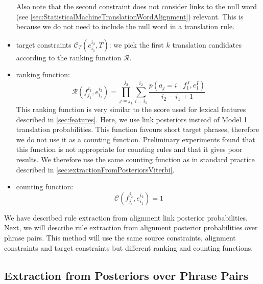 \begin{itemize}
\begin{equation}
  \label{eq:linksWithHighPosterior}
\end{equation}
%
Also note that the second
constraint does not consider links to the null
word (see \autoref{sec:StatisticalMachineTranslationWordAlignment}) relevant.
This is because we do not need to include the null word
in a translation rule.
  \item target constraints $\mathcal{C}_T(e_{i_1}^{i_2}, T)$: we pick the
    first $k$ translation candidates according to the ranking
    function $\mathcal{R}$.
  \item ranking function:
%
\begin{equation} \label{eq:linkPosRanking}
  \mathcal{R}(f_{j_1}^{j_2},e_{i_1}^{i_2}) = \prod_{j=j_1}^{j_2} \sum_{i=i_1}^{i_2} \frac{p(a_j = i \mid f_1^J,e_1^I)}{i_2-i_1+1}
\end{equation}
%
This ranking function is very similar to the score used for lexical features
described in \autoref{sec:features}. Here,
we use link posteriors instead of Model 1 translation probabilities. This
function favours short target phrases, therefore we do not use it as a counting
function. Preliminary experiments found that this function is not appropriate for
counting rules and that it gives poor results. We therefore use the same counting
function as in standard practice described in
\autoref{sec:extractionFromPosteriorsViterbi}.
  \item counting function:
%
\begin{equation}
  \mathcal{C}(f_{j_1}^{j_2},e_{i_1}^{i_2}) = 1
\end{equation}
%
\end{itemize}

We have described rule extraction from alignment link posterior
probabilities. Next, we will describe rule extraction from alignment
posterior probabilities over phrase pairs. This method will use the
same source constraints, alignment constraints and target constraints
but different ranking and counting functions.

\subsection{Extraction from Posteriors over Phrase Pairs}
\label{sec:extractionFromPosteriorsPhrasePair}

